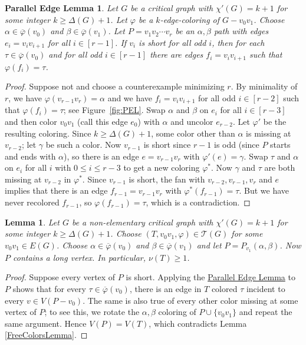 \documentclass[12pt]{article}
\theoremstyle{plain}
\newtheorem{lem}[thm]{Lemma}
\newtheorem*{PEL}{Parallel Edge Lemma}
\theoremstyle{definition}
\theoremstyle{remark}
\newcommand{\fancy}[1]{\mathcal{#1}}
\newcommand{\T}{\fancy{T}}
\newcommand{\vph}{\varphi}
\newcommand{\vphn}{\overline{\varphi}}
\begin{document}
\begin{PEL}\label{SpecialPath}
Let $G$ be a critical graph with $\chi'(G) = k+1$ for some integer $k \ge
\Delta(G) + 1$.  Let $\vph$ be a $k$-edge-coloring of $G-v_0v_1$.  Choose
$\alpha \in \vphn(v_0)$ and $\beta \in \vphn(v_1)$.  Let $P = v_1v_2\cdots v_r$
be an $\alpha,\beta$ path with edges $e_i = v_iv_{i+1}$ for all $i\in[r-1]$. 
If $v_i$ is short for all odd $i$, then for each $\tau \in \vphn(v_0)$ %
and for all odd $i\in[r-1]$ there are edges $f_i = v_iv_{i+1}$ such that 
$\vph(f_i) = \tau$. %
\end{PEL}
\begin{proof}
Suppose not and choose a counterexample minimizing $r$.  By minimality of
$r$, we have $\vph(v_{r-1}v_r) = \alpha$ and we have $f_i = v_iv_{i+1}$ for
all odd $i\in[r-2]$ such that %
$\vph(f_i) = \tau$; %
see Figure~\ref{fig:PEL}.  Swap $\alpha$ and $\beta$ on $e_i$ for all
$i\in [r-3]$ and then
color $v_0v_1$ (call this edge $e_0$) with $\alpha$ and uncolor $e_{r-2}$.  Let
$\vph'$ be the resulting coloring.  Since $k \ge \Delta(G) + 1$, some color
other than $\alpha$ is missing at $v_{r-2}$; let $\gamma$ be such a color.  Now 
$v_{r-1}$ is short since $r-1$ is odd (since $P$ starts and ends with
$\alpha$), so there is an edge $e = v_{r-1}v_r$ with $\vph'(e) = \gamma$.  
Swap $\tau$ and $\alpha$ on $e_i$ for all $i$ with $0 \le i \le r-3$ to get a
new coloring $\vph^*$.  Now $\gamma$ and $\tau$ are both missing at $v_{r-2}$
in $\vph^*$.  Since $v_{r-1}$ is short, the fan with $v_{r-2}, v_{r-1}, v_r$
and $e$ implies that there is an edge $f_{r-1} = v_{r-1}v_r$ with
$\vph^*(f_{r-1}) = \tau$.  But we have never recolored $f_{r-1}$, so
$\vph(f_{r-1})=\tau$, which is a contradiction.
\end{proof}



\begin{lem}\label{ZeroNonSpecial}
Let $G$ be a non-elementary critical graph with $\chi'(G) = k+1$ for some
integer $k \ge \Delta(G) + 1$.  Choose $(T, v_0v_1, \vph) \in \T(G)$ for some
$v_0v_1 \in E(G)$.  Choose $\alpha \in \vphn(v_0)$ and $\beta \in \vphn(v_1)$ and
let $P = P_{v_1}(\alpha, \beta)$.  Now $P$ contains a long vertex. 
In particular, $\nu(T) \ge 1$.
\label{lem2}
\end{lem}
\begin{proof}
Suppose every vertex of $P$ is short.  Applying the
\hyperref[SpecialPath]{Parallel Edge Lemma} to $P$
shows that for every $\tau \in \vphn(v_0)$, there is an edge in $T$ colored
$\tau$ incident to every $v \in V(P - v_0)$.  The same is also true of every 
other color missing at some vertex of $P$; to see this, we rotate the
$\alpha,\beta$ coloring of $P\cup\{v_0v_1\}$ and repeat the same argument. 
Hence $V(P) = V(T)$, which contradicts Lemma \ref{FreeColorsLemma}.
\end{proof}
\end{document}
